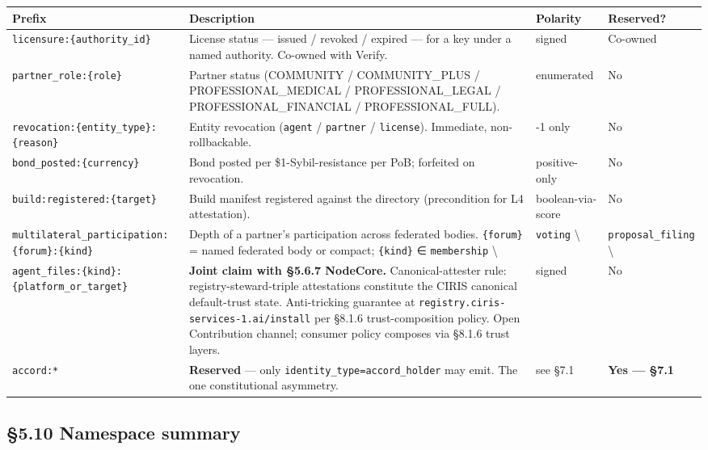 \documentclass[11pt]{article}
\begin{document}
{\scriptsize
\begin{longtable}{|p{4.0cm}|p{4.0cm}|p{4.0cm}|p{4.0cm}|}\hline
\textbf{Prefix} & \textbf{Description} & \textbf{Polarity} & \textbf{Reserved?} \\ \hline\endhead
\texttt{licensure:\{authority\_id\}} & License status — issued / revoked / expired — for a key under a named authority. Co-owned with Verify. & signed & Co-owned \\ \hline
\texttt{partner\_role:\{role\}} & Partner status (COMMUNITY / COMMUNITY\_PLUS / PROFESSIONAL\_MEDICAL / PROFESSIONAL\_LEGAL / PROFESSIONAL\_FINANCIAL / PROFESSIONAL\_FULL). & enumerated & No \\ \hline
\texttt{revocation:\{entity\_type\}:\{reason\}} & Entity revocation (\texttt{agent} / \texttt{partner} / \texttt{license}). Immediate, non-rollbackable. & -1 only & No \\ \hline
\texttt{bond\_posted:\{currency\}} & Bond posted per \$1-Sybil-resistance per PoB; forfeited on revocation. & positive-only & No \\ \hline
\texttt{build:registered:\{target\}} & Build manifest registered against the directory (precondition for L4 attestation). & boolean-via-score & No \\ \hline
\texttt{multilateral\_participation:\{forum\}:\{kind\}} & Depth of a partner's participation across federated bodies. \texttt{\{forum\}} = named federated body or compact; \texttt{\{kind\}} ∈ \texttt{membership} \textbackslash{} & \texttt{voting} \textbackslash{} & \texttt{proposal\_filing} \textbackslash{} \\ \hline
\texttt{agent\_files:\{kind\}:\{platform\_or\_target\}} & \textbf{Joint claim with §5.6.7 NodeCore.} Canonical-attester rule: registry-steward-triple attestations constitute the CIRIS canonical default-trust state. Anti-tricking guarantee at \texttt{registry.ciris-services-1.ai/install} per §8.1.6 trust-composition policy. Open Contribution channel; consumer policy composes via §8.1.6 trust layers. & signed & No \\ \hline
\texttt{accord:*} & \textbf{Reserved} — only \texttt{identity\_type=accord\_holder} may emit. The one constitutional asymmetry. & see §7.1 & \textbf{Yes — §7.1} \\ \hline
\end{longtable}}


\subsection*{§5.10 Namespace summary}
\end{document}
